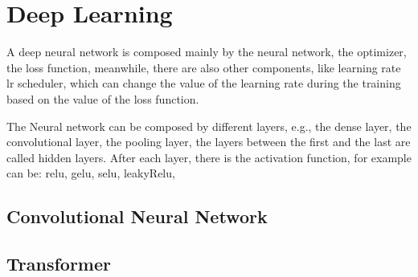 \section{Deep Learning}\label{sec:deep-learning}


A deep neural network is composed mainly by the neural network, the optimizer, the loss function, meanwhile, there are also other components, like learning rate lr scheduler, which can change the value of the learning rate during the training based on the value of the loss function.

The Neural network can be composed by different layers, e.g., the dense layer, the convolutional layer, the pooling layer, the layers between the first and the last are called hidden layers.
After each layer, there is the activation function, for example can be: relu, gelu, selu, leakyRelu,  %
\subsection{Convolutional Neural Network}\label{subsec:conv-neural-network}

\subsection{Transformer}\label{subsec:transformer}
